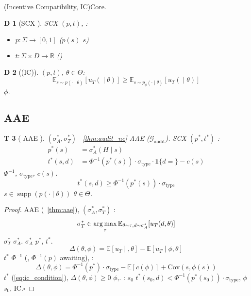 \documentclass[12pt,a4paper]{article}
\newtheorem{theorem}Theorem[section]
\newtheorem{definition}[theorem]Definition
\theoremstyle{remark}
\newcommand{\R}{\mathbb{R}}
\newcommand{\E}{\mathbb{E}}
\newcommand{\cG}{\mathcal{G}}
\newcommand{\ind}{\mathbf{1}}
\newcommand{\argmax}{\operatornamewithlimits{arg\,max}}
\newcommand{\supp}{\operatorname{supp}}
\begin{document}
{\subsection{}
(Incentive Compatibility, IC)Core.
\begin{definition}[SCX ]
 SCX $(p, t)$, : 
\begin{itemize}
 \item $p: \Sigma \to [0, 1]$ ($p(s)$ $s$)
 \item $t: \Sigma \times D \to \R$ ()
\end{itemize}
\end{definition}
\begin{definition}[(IC)]
 $(p, t)$, $\theta \in \Theta$: 
\begin{equation}\label{eq:ic}
 \E_{s \sim p(\cdot \mid \theta)}\left[u_T(\text{} \mid \theta)\right] \geq
 \E_{s \sim p_{\phi}(\cdot \mid \theta)}\left[u_T(\text{} \mid \theta)\right]
\end{equation}
 $\phi$.
\end{definition}
\subsection{ AAE}
\begin{theorem}[ AAE ]\label{thm:ic_aae}
 $(\sigma_A^*, \sigma_T^*)$ ~\ref{thm:audit_ne} AAE ($\cG_{\text{audit}}$).
 SCX $(p^*, t^*)$ : 
\begin{align}
 p^*(s) &= \sigma_A^*(H \mid s) \label{eq:p_star} \\
 t^*(s, d) &= \Phi^{-1}(p^*(s)) \cdot \sigma_{\text{type}} \cdot \ind\{d = \text{}\} - c(s) \label{eq:t_star}
\end{align}
 $\Phi^{-1}$, $\sigma_{\text{type}}$, $c(s)$.
\begin{equation}\label{eq:ic_condition}
 t^*(s, d) \geq \Phi^{-1}(p^*(s)) \cdot \sigma_{\text{type}}
\end{equation}
 $s \in \supp(p(\cdot \mid \theta))$ $\theta \in \Theta$.
\end{theorem}
\begin{proof}
 AAE (~\ref{thm:aae}), $(\sigma_A^*, \sigma_T^*)$ : 
\[
\sigma_T^* \in \argmax_{\tau} \E_{\theta \sim \tau, d \sim \sigma_A^*}[u_T(d, \theta)]
\]
 $\sigma_T^*$ $\sigma_A^*$. $\sigma_A^*$ $p^*$, $t^*$.
\[
\Delta(\theta, \phi) = \E[u_T \mid \text{}, \theta] - \E[u_T \mid \text{} \phi, \theta]
\]
 $t^*$ $\Phi^{-1}$ (, $\Phi^{-1}(p)$ awaiting), : 
\[
\Delta(\theta, \phi) = \Phi^{-1}(p^*) \cdot \sigma_{\text{type}} - \E[c(\phi)] + \text{Cov}(s, \phi(s))
\]
 $t^*$ (\ref{eq:ic_condition}), $\Delta(\theta, \phi) \geq 0$ $\phi$,.
: $s_0$ $t^*(s_0, d) < \Phi^{-1}(p^*(s_0)) \cdot \sigma_{\text{type}}$, $\phi$ $s_0$, IC.$\square$
\end{proof}
}
\end{document}
